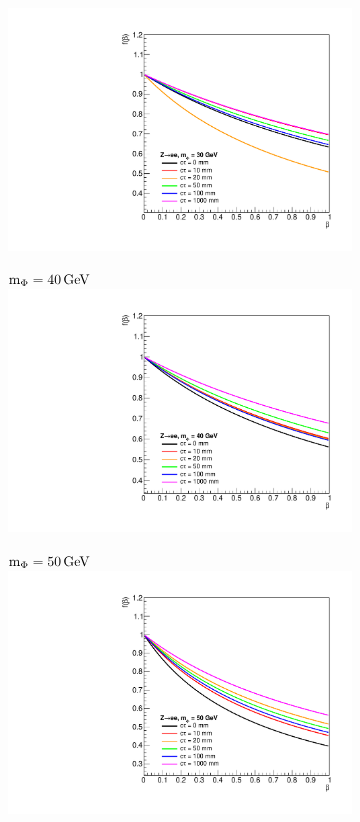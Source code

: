 \begin{figure}[htb!]
\begin{subfigure}{0.3\linewidth}
		\includegraphics[width=\linewidth]{figs/05_analysis/BR_Z_ELE_30.pdf}
	\end{subfigure}
	\begin{subfigure}{0.3\linewidth}
		\centering
		$\text{m}_\Phi=40\,\text{Ge\hspace{-.08em}V}$
		\includegraphics[width=\linewidth]{figs/05_analysis/BR_Z_ELE_40.pdf}
	\end{subfigure}
	\begin{subfigure}{0.3\linewidth}
		\centering
		$\text{m}_\Phi=50\,\text{Ge\hspace{-.08em}V}$
		\includegraphics[width=\linewidth]{figs/05_analysis/BR_Z_ELE_50.pdf}

\end{subfigure}
\end{figure}
